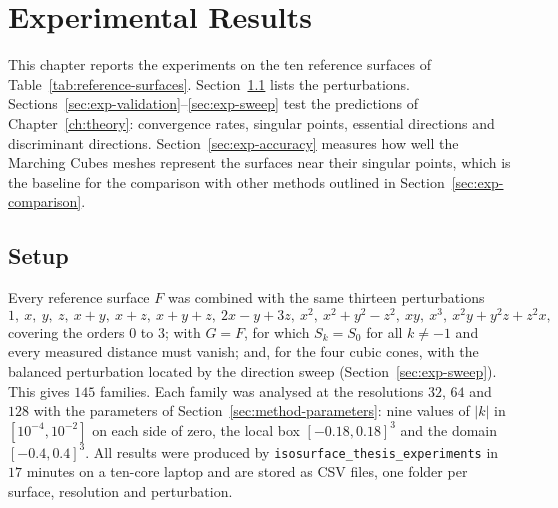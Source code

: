 \chapter{Experimental Results}
\label{ch:experiments}

This chapter reports the experiments on the ten reference surfaces of
Table~\ref{tab:reference-surfaces}. Section~\ref{sec:exp-setup} lists the
perturbations. Sections~\ref{sec:exp-validation}--\ref{sec:exp-sweep} test
the predictions of Chapter~\ref{ch:theory}: convergence rates, singular
points, essential directions and discriminant directions.
Section~\ref{sec:exp-accuracy} measures how well the Marching Cubes meshes
represent the surfaces near their singular points, which is the baseline for
the comparison with other methods outlined in Section~\ref{sec:exp-comparison}.

\section{Setup}
\label{sec:exp-setup}

Every reference surface $F$ was combined with the same thirteen perturbations
\[
1,\ x,\ y,\ z,\ x+y,\ x+z,\ x+y+z,\ 2x-y+3z,\ x^2,\ x^2+y^2-z^2,\ xy,\ x^3,\ x^2y+y^2z+z^2x,
\]
covering the orders $0$ to $3$; with $G=F$, for which $S_k=S_0$ for all
$k\neq-1$ and every measured distance must vanish; and, for the four cubic cones,
with the balanced perturbation located by the direction sweep
(Section~\ref{sec:exp-sweep}). This gives $145$ families. Each family was
analysed at the resolutions $32$, $64$ and $128$ with the parameters of
Section~\ref{sec:method-parameters}: nine values of $|k|$ in
$[10^{-4},10^{-2}]$ on each side of zero, the local box $[-0.18,0.18]^3$ and
the domain $[-0.4,0.4]^3$. All results were produced by
\texttt{isosurface\_thesis\_experiments} in $17$ minutes on a ten-core laptop and are
stored as CSV files, one folder per surface, resolution and perturbation.


